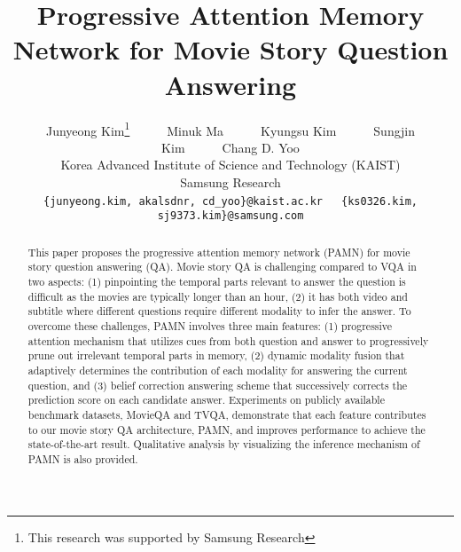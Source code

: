 \documentclass[10pt,twocolumn,letterpaper]{article}
\begin{document}
\title{Progressive Attention Memory Network for Movie Story Question Answering}



\author{Junyeong Kim\thanks{This research was supported by Samsung Research}\ \ \ \ \ \ Minuk Ma\ \ \ \ \ \ Kyungsu Kim\ \ \ \ \ \ Sungjin Kim\ \ \ \ \ \ Chang D. Yoo \\ Korea Advanced Institute of Science and Technology (KAIST) \\  Samsung Research \\{\tt\small \{junyeong.kim, akalsdnr, cd\_yoo\}@kaist.ac.kr}\ \ \ {\tt\small \{ks0326.kim, sj9373.kim\}@samsung.com}}


\maketitle


\begin{abstract}
   This paper proposes the progressive attention memory network (PAMN) for movie story question answering (QA). Movie story QA is challenging compared to VQA in two aspects: (1) pinpointing the temporal parts relevant to answer the question is difficult as the movies are typically longer than an hour, (2) it has both video and subtitle where different questions require different modality to infer the answer. To overcome these challenges, PAMN involves three main features: (1) progressive attention mechanism that utilizes cues from both question and answer to progressively prune out irrelevant temporal parts in memory, (2) dynamic modality fusion that adaptively determines the contribution of each modality for answering the current question, and (3) belief correction answering scheme that successively corrects the prediction score on each candidate answer. Experiments on publicly available benchmark datasets, MovieQA and TVQA, demonstrate that each feature contributes to our movie story QA architecture, PAMN, and improves performance to achieve the state-of-the-art result. Qualitative analysis by visualizing the inference mechanism of PAMN is also provided.
\end{abstract}
\end{document}

